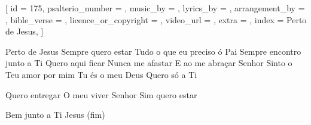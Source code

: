 [
    id                     = {175},
    psalterio_number       = {},
    music_by               = {},
    lyrics_by              = {},
    arrangement_by         = {},
    bible_verse            = {},
    licence_or_copyright   = {},
    video_url              = {},
    extra                  = {},
    index                  = {Perto de Jesus},
]


\beginverse
Perto de Jesus
Sempre quero estar
Tudo o que eu preciso ó Pai
Sempre encontro junto a Ti
Quero aqui ficar
Nunca me afastar
E ao me abraçar Senhor
Sinto o Teu amor por mim
Tu és o meu Deus
Quero só a Ti
\endverse


\beginchorus
Quero entregar 
O meu viver Senhor
Sim quero estar

Bem junto a Ti Jesus (fim)
\endchorus



\endsong
